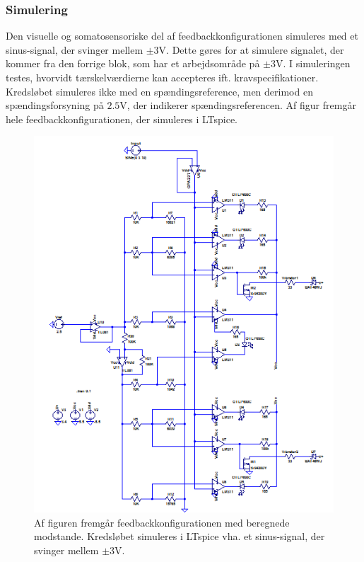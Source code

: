 \subsubsection{Simulering}
Den visuelle og somatosensoriske del af feedbackkonfigurationen simuleres med et sinus-signal, der svinger mellem $\pm3$V. Dette gøres for at simulere signalet, der kommer fra den forrige blok, som har et arbejdsområde på $\pm3$V. I simuleringen testes, hvorvidt tærskelværdierne kan accepteres ift. kravspecifikationer. Kredsløbet simuleres ikke med en spændingsreference, men derimod en spændingsforsyning på $2.5$V, der indikerer spændingsreferencen. Af figur  fremgår hele feedbackkonfigurationen, der simuleres i LTspice.

\begin{figure}[H]
	\centering
	\includegraphics[scale=0.9]{figures/cProblemloesning/komparator_samlet.PNG}
	\caption{Af figuren fremgår feedbackkonfigurationen med beregnede modstande. Kredsløbet simuleres i LTspice vha. et sinus-signal, der svinger mellem $\pm3$V.}
	\label{fig:komparator_samlet}
\end{figure}
 
